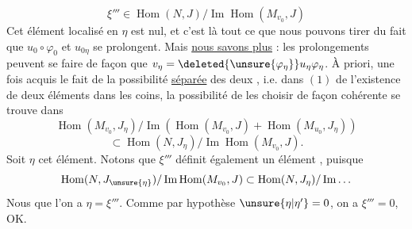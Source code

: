 \[
\xi'''\in\operatorname{Hom}(N,J)/\operatorname{Im}\operatorname{Hom}(M_{v_0},J)
\]
 Cet élément localisé en $\eta$ est nul,  et
c'est là tout ce que nous pouvons tirer du
fait que $u_0\circ\varphi_0$ et $u_{0\eta}$ se prolongent. Mais
\uline{nous savons plus} : les prolongements  peuvent se faire
de façon que $v_\eta=\deleted{\unsure{\varphi_\eta}}u_\eta\varphi_\eta$. À priori,
 une fois acquis le fait de la possibilité
\uline{séparée} des deux , i.e. dans $(1)$
de l'existence de deux éléments dans les
coins, la  possibilité de les choisir de
façon cohérente se trouve dans
\[
\operatorname{Hom}(M_{v_0},J_\eta)/\operatorname{Im}
(\operatorname{Hom}(M_{v_0},J)+\operatorname{Hom}(M_{u_0},J_\eta))
\]
\[
\subset\operatorname{Hom}(N,J_\eta)/\operatorname{Im}\operatorname{Hom}(M_{v_0},J).
\]
Soit $\eta$ cet élément. Notons que $\xi'''$ définit
également un élément ,
puisque
\[
\operatorname{Hom}(N,J_{\unsure{\eta}})/\operatorname{Im}\operatorname{Hom}(M_{v_0},J)
\subset\operatorname{Hom}(N,J_\eta)/\operatorname{Im}\ldots
\]
Nous  que l'on a $\eta=\xi'''$. Comme
par hypothèse $\unsure{\eta|\eta'}=0$, on a $\xi'''=0$, OK.
